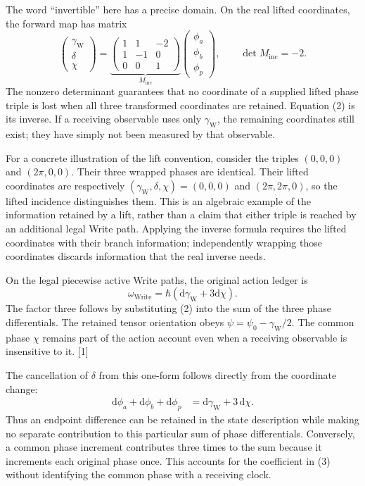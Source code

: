 \documentclass[10pt,twocolumn,letterpaper]{article}
\begin{document}
The word ``invertible'' here has a precise domain. On the real lifted coordinates, the forward map has matrix
\[
\begin{pmatrix}
\gamma_{\mathrm W}\\ \delta\\ \chi
\end{pmatrix}
=
\underbrace{\begin{pmatrix}
1&1&-2\\ 1&-1&0\\ 0&0&1
\end{pmatrix}}_{M_{\mathrm{inc}}}
\begin{pmatrix}
\phi_a\\ \phi_b\\ \phi_p
\end{pmatrix},
\qquad \det M_{\mathrm{inc}}=-2.
\]
The nonzero determinant guarantees that no coordinate of a supplied lifted phase triple is lost when all three transformed coordinates are retained. Equation (2) is its inverse. If a receiving observable uses only $\gamma_{\mathrm W}$, the remaining coordinates still exist; they have simply not been measured by that observable.

For a concrete illustration of the lift convention, consider the triples $(0,0,0)$ and $(2\pi,0,0)$. Their three wrapped phases are identical. Their lifted coordinates are respectively $(\gamma_{\mathrm W},\delta,\chi)=(0,0,0)$ and $(2\pi,2\pi,0)$, so the lifted incidence distinguishes them. This is an algebraic example of the information retained by a lift, rather than a claim that either triple is reached by an additional legal Write path. Applying the inverse formula requires the lifted coordinates with their branch information; independently wrapping those coordinates discards information that the real inverse needs.


On the legal piecewise active Write paths, the original action ledger is
\begin{equation}
\omega_{\mathrm{Write}}=\hbar(\mathrm{d}\gamma_{\mathrm{W}}+3\mathrm{d}\chi).
\tag{3}
\end{equation}
The factor three follows by substituting (2) into the sum of the three phase differentials. The retained tensor orientation obeys $\psi=\psi_0-\gamma_{\mathrm{W}}/2$. The common phase $\chi$ remains part of the action account even when a receiving observable is insensitive to it. [1]

The cancellation of $\delta$ from this one-form follows directly from the coordinate change:
\[
\begin{aligned}
\mathrm d\phi_a+\mathrm d\phi_b+\mathrm d\phi_p
&=\mathrm d\gamma_{\mathrm W}+3\,\mathrm d\chi.
\end{aligned}
\]
Thus an endpoint difference can be retained in the state description while making no separate contribution to this particular sum of phase differentials. Conversely, a common phase increment contributes three times to the sum because it increments each original phase once. This accounts for the coefficient in (3) without identifying the common phase with a receiving clock.
\end{document}
